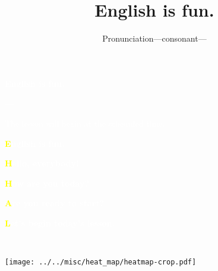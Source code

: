 \documentclass[aspectratio=169,xcolor={dvipsnames,table}]{beamer}
\title{English is fun.}
\subtitle{Pronunciation---consonant---}
\author{}
\institute[]{}
\date[]
\makeatletter
\newcommand*{\themonth}{\two@digits\month}
\newcommand*{\theday}{\two@digits\day}
\newcommand{\mytoday}{{\the\year}--{\themonth}--{\theday}}
\makeatother
\begin{document}
\begin{frame}
\raggedleft
  \textcolor{white}{\Huge\bfseries English is fun.}

\vfill

\raggedleft
 \textcolor{white}{\LARGE\bfseries \mytoday}

\vfill
\vfill
\vfill

\raggedleft
\textcolor{white}{\large The lesson will begin at the scheduled time.}

\end{frame}

\begin{frame}
\raggedleft
  \textcolor{white}{\Huge\bfseries \textcolor{yellow}{E}nglish is fun.}

\vfill

\vfill

\raggedleft
 \textcolor{white}{\LARGE\bfseries \textcolor{yellow}{H}ello, everybody!}

 \textcolor{white}{\LARGE\bfseries \textcolor{yellow}{H}ow are you today?}

\raggedleft
 \textcolor{white}{\LARGE\bfseries \textcolor{yellow}{A}re you ready to start?}

 \textcolor{white}{\LARGE\bfseries \textcolor{yellow}{L}et's begin today's lesson.}

\vfill

\raggedleft
 \textcolor{white}{\Large \bfseries \mytoday}

\hyperlink{today}{}

\end{frame}
\begin{frame}[plain]

\hspace*{-22pt}
\texttt{[image: ../../misc/heat\_map/heatmap-crop.pdf]}
\end{frame}
\end{document}
